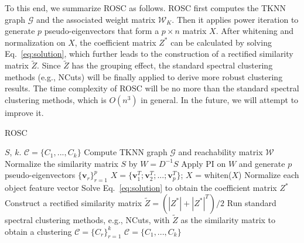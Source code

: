 {To this end, we summarize ROSC as follows.
ROSC first computes the TKNN graph $\mathcal{G}$
and the associated weight matrix $\mathcal{W}_K$. Then it applies power iteration to generate $p$
pseudo-eigenvectors that form a $p \times n$ matrix $X$.
After whitening and normalization on $X$,
the coefficient matrix $Z^*$ can be calculated by solving Eq.~\ref{eq:solution},
which further leads to the construction of a rectified similarity matrix $\tilde{Z}$.
Since $\tilde{Z}$ has the grouping effect, 
the standard spectral clustering methods (e.g., NCuts) will be finally applied to derive more robust clustering results.
The time complexity of ROSC will be no more than the standard spectral clustering methods,
which is $O(n^3)$ in general.
In the future, we will attempt to improve it. 
}

\begin{algorithm}
\begin{small}
\caption{ROSC}
\label{alg}
\begin{algorithmic}[1]
\Require $S$, $k$.
\Ensure $\mathcal{C} = \{C_1, ..., C_k\}$
\State Compute TKNN graph $\mathcal{G}$ and reachability matrix $\mathcal{W}$
\State Normalize the similarity matrix $S$ by $W = D^{-1}S$
\State Apply PI on $W$ and generate $p$ pseudo-eigenvectors $\{\bm{v}_r\}_{r=1}^p$
\State $X = \{\bm{v}_1^T; \bm{v}_2^T; ...; \bm{v}_p^T\}$; $X$ = whiten($X$)
\State Normalize each object feature vector
\State Solve Eq.~\ref{eq:solution} to obtain the coefficient matrix $Z^*$
\State Construct a rectified similarity matrix $\tilde{Z} = (|Z^*| + |Z^*|^T)/2$
\State Run standard spectral clustering methods, e.g., NCuts, with $\tilde{Z}$ as the
similarity matrix to obtain a clustering $\mathcal{C} = \{C_r\}_{r=1}^k$
\State \Return $\mathcal{C} = \{C_1, ..., C_k\}$
\end{algorithmic}
\end{small}
\end{algorithm}







